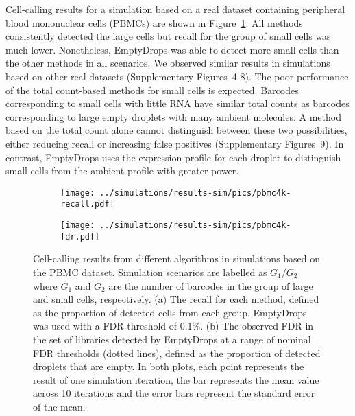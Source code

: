 \documentclass[10pt,letterpaper]{article}
\newcommand{\suppfigsimresults}{4-8}
\newcommand{\suppfigsimrocs}{9}
\begin{document}
Cell-calling results for a simulation based on a real dataset containing peripheral blood mononuclear cells (PBMCs) are shown in Figure~\ref{fig:simpbmc}.
All methods consistently detected the large cells but recall for the group of small cells was much lower.
Nonetheless, EmptyDrops was able to detect more small cells than the other methods in all scenarios.
We observed similar results in simulations based on other real datasets (Supplementary Figures~\suppfigsimresults{}).
The poor performance of the total count-based methods for small cells is expected.
Barcodes corresponding to small cells with little RNA have similar total counts as barcodes corresponding to large empty droplets with many ambient molecules.
A method based on the total count alone cannot distinguish between these two possibilities, either reducing recall or increasing false positives (Supplementary Figures~\suppfigsimrocs{}).
In contrast, EmptyDrops uses the expression profile for each droplet to distinguish small cells from the ambient profile with greater power.

\begin{figure}[btp]
    \begin{center}
        \begin{subfigure}{\textwidth}
        \texttt{[image: ../simulations/results-sim/pics/pbmc4k-recall.pdf]}
        \caption{}
        \end{subfigure}
        \begin{subfigure}{\textwidth}
        \texttt{[image: ../simulations/results-sim/pics/pbmc4k-fdr.pdf]}
        \caption{}
        \end{subfigure}
    \end{center}
\caption{Cell-calling results from different algorithms in simulations based on the PBMC dataset.
Simulation scenarios are labelled as $G_1/G_2$ where $G_1$ and $G_2$ are the number of barcodes in the group of large and small cells, respectively.
(a) The recall for each method, defined as the proportion of detected cells from each group.
EmptyDrops was used with a FDR threshold of 0.1\%.
(b) The observed FDR in the set of libraries detected by EmptyDrops at a range of nominal FDR thresholds (dotted lines), defined as the proportion of detected droplets that are empty.
In both plots, each point represents the result of one simulation iteration, the bar represents the mean value across 10 iterations and the error bars represent the standard error of the mean.
}
\label{fig:simpbmc}
\end{figure}
\end{document}
